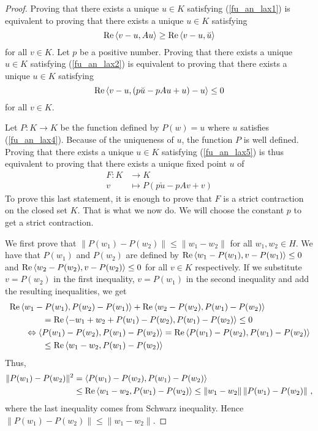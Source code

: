 \begin{proof}
Proving that there exists a unique $u\in K$ satisfying 
(\ref{fu_an_lax1}) is equivalent to proving that there exists a unique
$u\in K$ satisfying
\begin{equation} \label{fu_an_lax2}
\operatorname{Re} \left\langle{v-u} , {Au}\right\rangle \geq \operatorname{Re} \left\langle{v-u} , {\breve{u}}\right\rangle
\end{equation}
for all $v \in K$.  Let $p$ be a positive number.  Proving that there
exists a unique $u\in K$ satisfying (\ref{fu_an_lax2}) is equivalent
to proving that there exists a unique $u\in K$ satisfying
\begin{equation} \label{fu_an_lax5}
\operatorname{Re} \left\langle{v-u} , { \left(p\breve{u}-p Au +u\right)-u}\right\rangle \leq 0
\end{equation}
for all $v \in K$.

Let $P:K \rightarrow K$ be the function defined by
$\displaystyle P(w) = u$ where $u$ satisfies (\ref{fu_an_lax4}).
Because of the uniqueness of $u$, the function $P$ is well defined.
Proving that there exists a unique $u\in K$ satisfying
(\ref{fu_an_lax5}) is thus equivalent to proving that there exists a
unique fixed point $u$ of
\begin{align*}
F: K &\rightarrow K \\
 v & \mapsto P(p\breve{u}-p Av +v)
\end{align*}
To prove this last statement, it is enough to prove that $F$ is a
strict contraction on the closed set $K$.  That is what we now do.  We
will choose the constant $p$ to get a strict contraction.

We first prove that $\|P(w_1) - P(w_2) \| \leq \|w_1 - w_2\|$ for all
$w_1, w_2 \in H$.  We have that $P(w_1)$ and $P(w_2)$ are defined by
$\displaystyle \operatorname{Re} \left\langle{w_1- P(w_1)} , {v- P(w_1)}\right\rangle \leq 0$ and
$\displaystyle \operatorname{Re} \left\langle{w_2- P(w_2)} , {v- P(w_2)}\right\rangle \leq 0$
for all $v \in K$ respectively.  If we substitute $v=P(w_2)$ in the
first inequality, $v=P(w_1)$ in the second inequality and add the
resulting inequalities, we get
\begin{align*}
&\operatorname{Re} \left\langle{w_1- P(w_1)} , {P(w_2)- P(w_1)}\right\rangle + \operatorname{Re} \left\langle{w_2- P(w_2)} , {P(w_1)- P(w_2)}\right\rangle \\
&\qquad \qquad = \operatorname{Re} \left\langle{-w_1 + w_2 + P(w_1) - P(w_2)} , {P(w_1)- P(w_2)}\right\rangle \leq 0 \\
&\qquad \Leftrightarrow
\left\langle{P(w_1) - P(w_2)} , {P(w_1)- P(w_2)}\right\rangle = \operatorname{Re} \left\langle{P(w_1) - P(w_2)} , {P(w_1)- P(w_2)}\right\rangle \\
&\qquad \qquad \leq \operatorname{Re} \left\langle{w_1- w_2} , {P(w_1)- P(w_2)}\right\rangle
\end{align*}
Thus,
\begin{align*}
\|P(w_1) - P(w_2) \|^2 &= \left\langle{P(w_1)- P(w_2)} , {P(w_1)- P(w_2)}\right\rangle \\
& \leq \operatorname{Re} \left\langle{w_1- w_2} , {P(w_1)- P(w_2)}\right\rangle
\leq \|w_1 - w_2 \| \, \|P(w_1) - P(w_2) \| \ ,
\end{align*}
where the last inequality comes from Schwarz inequality.
Hence $\displaystyle \|P(w_1) - P(w_2)\| \leq \| w_1 - w_2 \|$.


\end{proof}
